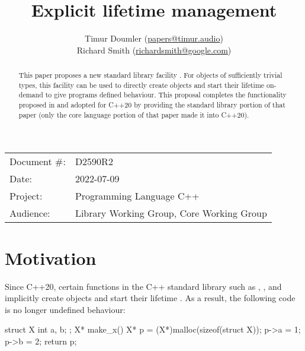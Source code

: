 

\newcommand{\forceindent}{\parindent=1em\indent\parindent=0pt\relax} %


\title{Explicit lifetime management}
\author{
  Timur Doumler \small(\href{mailto:papers@timur.audio}{papers@timur.audio}) \\
  Richard Smith \small(\href{mailto:richardsmith@google.com}{richardsmith@google.com})
}
\date{}
\maketitle

\begin{tabular}{ll}
Document \#: & D2590R2 \\
Date: & 2022-07-09\\
Project: & Programming Language C++ \\
Audience: & Library Working Group, Core Working Group
\end{tabular}


\begin{abstract}
This paper proposes a new standard library facility . For objects of sufficiently trivial types, this facility can be used to directly create objects and start their lifetime on-demand to give programs defined behaviour. This proposal completes the functionality  proposed in \cite{P0593R6} and adopted for C++20 by providing the standard library portion of that paper (only the core language portion of that paper made it into C++20).
\end{abstract}

\section{Motivation}
\label{sec:motivation}

Since C++20, certain functions in the C++ standard library such as , , and  implicitly create objects and start their lifetime \cite{P0593R6}. As a result, the following code is no longer undefined behaviour:

\begin{codeblock}
struct X { int a, b; };
X* make_x() {
  X* p = (X*)malloc(sizeof(struct X));
  p->a = 1;
  p->b = 2;
  return p;
}
\end{codeblock}

